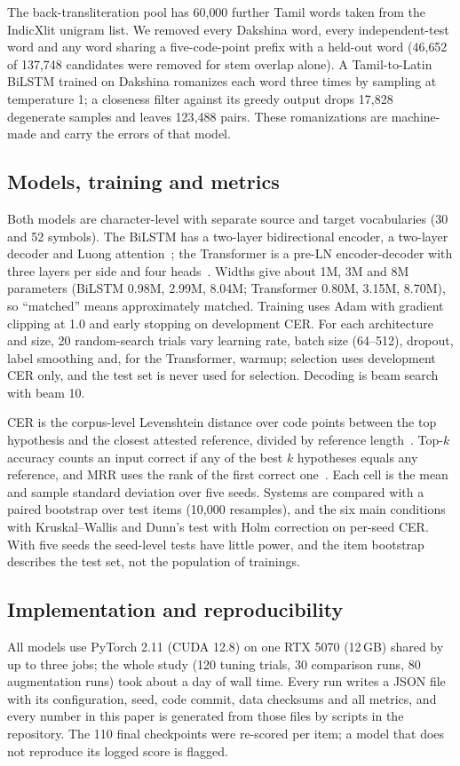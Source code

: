 \documentclass[conference]{IEEEtran}
\begin{document}
The back-transliteration pool has 60{,}000 further Tamil words taken from the IndicXlit unigram list.
We removed every Dakshina word, every independent-test word and any word sharing a five-code-point prefix with a held-out word (46{,}652 of 137{,}748 candidates were removed for stem overlap alone).
A Tamil-to-Latin BiLSTM trained on Dakshina romanizes each word three times by sampling at temperature 1; a closeness filter against its greedy output drops 17{,}828 degenerate samples and leaves 123{,}488 pairs.
These romanizations are machine-made and carry the errors of that model.

\subsection{Models, training and metrics}
Both models are character-level with separate source and target vocabularies (30 and 52 symbols).
The BiLSTM has a two-layer bidirectional encoder, a two-layer decoder and Luong attention~\cite{luong2015effective,bahdanau2015neural}; the Transformer is a pre-LN encoder-decoder with three layers per side and four heads~\cite{vaswani2017attention}.
Widths give about 1M, 3M and 8M parameters (BiLSTM 0.98M, 2.99M, 8.04M; Transformer 0.80M, 3.15M, 8.70M), so ``matched'' means approximately matched.
Training uses Adam with gradient clipping at 1.0 and early stopping on development CER.
For each architecture and size, 20 random-search trials vary learning rate, batch size (64--512), dropout, label smoothing and, for the Transformer, warmup; selection uses development CER only, and the test set is never used for selection.
Decoding is beam search with beam 10.

CER is the corpus-level Levenshtein distance over code points between the top hypothesis and the closest attested reference, divided by reference length~\cite{roark2020dakshina,kirov2024context}.
Top-$k$ accuracy counts an input correct if any of the best $k$ hypotheses equals any reference, and MRR uses the rank of the first correct one~\cite{chen2018news}.
Each cell is the mean and sample standard deviation over five seeds.
Systems are compared with a paired bootstrap over test items (10{,}000 resamples), and the six main conditions with Kruskal--Wallis and Dunn's test with Holm correction on per-seed CER.
With five seeds the seed-level tests have little power, and the item bootstrap describes the test set, not the population of trainings.

\subsection{Implementation and reproducibility}
All models use PyTorch 2.11 (CUDA 12.8) on one RTX 5070 (12\,GB) shared by up to three jobs; the whole study (120 tuning trials, 30 comparison runs, 80 augmentation runs) took about a day of wall time.
Every run writes a JSON file with its configuration, seed, code commit, data checksums and all metrics, and every number in this paper is generated from those files by scripts in the repository.
The 110 final checkpoints were re-scored per item; a model that does not reproduce its logged score is flagged.
\end{document}
